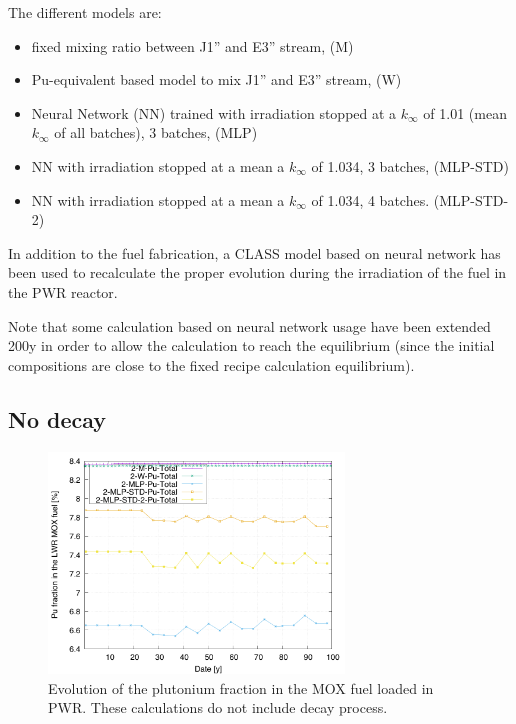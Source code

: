 \documentclass[12pt]{article}
\begin{document}
The different models are:
\begin{itemize}
  \item fixed mixing ratio between J1'' and E3'' stream, (M)
  \item	Pu-equivalent based model to mix J1'' and E3'' stream, (W)
  \item	Neural Network (NN) trained with irradiation stopped at a $k_{\infty}$ of 1.01 (mean $k_{\infty}$ of all batches), 3 batches, (MLP)
  \item	NN with irradiation stopped at a mean a $k_{\infty}$ of 1.034, 3 batches, (MLP-STD)
  \item	NN with irradiation stopped at a mean a $k_{\infty}$ of 1.034, 4 batches. (MLP-STD-2)
\end{itemize}

In addition to the fuel fabrication, a CLASS model based on neural network has
been used to recalculate the proper evolution during the irradiation of the fuel
in the PWR reactor.

Note that some calculation based on neural network usage have been extended 200y
in order to allow the calculation to reach the equilibrium (since the initial
compositions are close to the fixed recipe calculation equilibrium).

\subsection{No decay}

\begin{figure}[h!]
  \centering
  \includegraphics[width=0.7\textwidth]  {img/C_1_2_MOX_pu_contribution}
  \caption{Evolution of the plutonium fraction in the MOX fuel loaded in PWR.
  These calculations do not include decay process.}
  \label{fig:pufrac_ND}
\end{figure}
%  
%  
\end{document}
